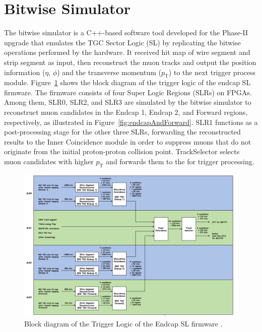 \section{Bitwise Simulator} \label{sec:BitwiseSimulator}
The bitwise simulator is a C++-based software tool developed for the Phase-II upgrade that emulates the TGC Sector Logic (SL) by replicating the bitwise operations performed by the hardware. It received hit map of wire segment and strip segment as input, then reconstruct the muon tracks and output the position information ($\eta$, $\phi$) and the transverse momentum ($p_\mathrm{T}$) to the next trigger process module. Figure~\ref{fig:blockDiagram} shows the block diagram of the trigger logic of the endcap SL firmware. The firmware consists of four Super Logic Regions (SLRs) on FPGAs. Among them, SLR0, SLR2, and SLR3 are simulated by the bitwise simulator to reconstruct muon candidates in the Endcap 1, Endcap 2, and Forward regions, respectively, as illustrated in Figure~\ref{fig:endcapAndForward}. SLR1 functions as a post-processing stage for the other three SLRs, forwarding the reconstructed results to the Inner Coincidence module in order to suppress muons that do not originate from the initial proton-proton collision point.
TrackSelector selects muon candidates with higher $p_\mathrm{T}$ and forwards them to the \MUCTPI for trigger processing.
\begin{figure}[htbp]
  \centering
  \includegraphics[width=1\textwidth]{figs/chapter5/block_diagram_of_trigger_logic.png}
  \caption{Block diagram of the Trigger Logic of the Endcap SL firmware \cite{EndcapSLPDR}.}
  \label{fig:blockDiagram}
\end{figure}

